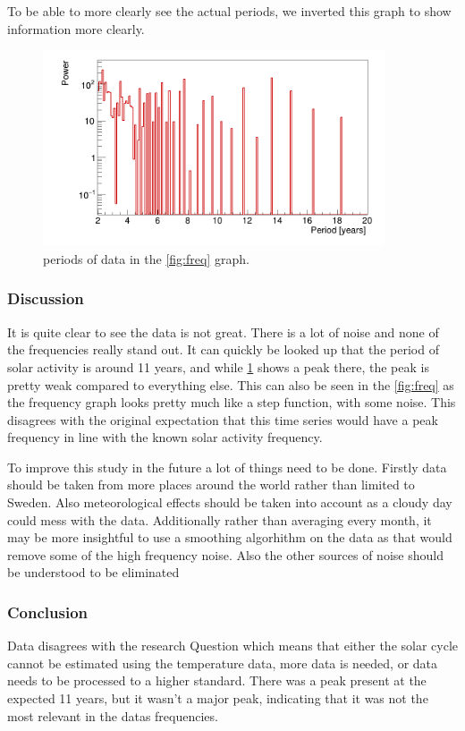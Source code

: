 To be able to more clearly see the actual periods, we inverted this graph to show information more clearly.

\begin{figure}[H]
    \centering
    \includegraphics[width=0.9\textwidth]{plots/solar/period_analysis.png}
    \caption{periods of data in the \ref{fig:freq} graph.}
    \label{fig:period}
\end{figure}

\subsubsection{Discussion}

It is quite clear to see the data is not great. There is a lot of noise and none of the frequencies really stand out. It can quickly be looked up that the period of solar activity is around 11 years, and while \ref{fig:period} shows a peak there, the peak is pretty weak compared to everything else. This can also be seen in the \ref{fig:freq} as the frequency graph looks pretty much like a step function, with some noise. This disagrees with the original expectation that this time series would have a peak frequency in line with the known solar activity frequency.

To improve this study in the future a lot of things need to be done. Firstly data should be taken from more places around the world rather than limited to Sweden. Also meteorological effects should be taken into account as a cloudy day could mess with the data. Additionally rather than averaging every month, it may be more insightful to use a smoothing algorhithm on the data as that would remove some of the high frequency noise. Also the other sources of noise should be understood to be eliminated

\subsubsection{Conclusion}

Data disagrees with the research Question which means that either the solar cycle cannot be estimated using the temperature data, more data is needed, or data needs to be processed to a higher standard. There was a peak present at the expected 11 years, but it wasn't a major peak, indicating that it was not the most relevant in the datas frequencies.